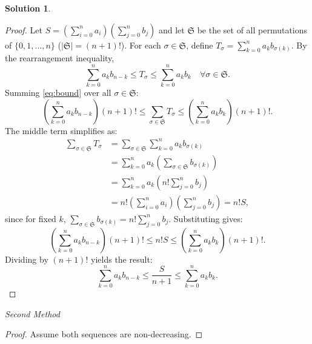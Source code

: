 \documentclass[12pt]{article}
\theoremstyle{definition}
\newtheorem*{solution}{\normalfont\textbf{Solution}}
\begin{document}
\begin{enumerate}[leftmargin=*]
\begin{solution}
\begin{proof}
                Let $S = \left( \sum_{i=0}^n a_i \right) \left( \sum_{j=0}^n b_j \right)$ and let $\mathfrak{S}$ be the set of all permutations of $\{0,1,\dots,n\}$ ($|\mathfrak{S}| = (n+1)!$). For each $\sigma \in \mathfrak{S}$, define $T_\sigma = \sum_{k=0}^n a_k b_{\sigma(k)}$. By the rearrangement inequality,
                \begin{equation}
                \sum_{k=0}^n a_k b_{n-k} \leq T_\sigma \leq \sum_{k=0}^n a_k b_k \quad \forall \sigma \in \mathfrak{S}. \label{eq:bound}
                \end{equation}
                Summing \eqref{eq:bound} over all $\sigma \in \mathfrak{S}$:
                \[
                \left( \sum_{k=0}^n a_k b_{n-k} \right) (n+1)! \leq \sum_{\sigma \in \mathfrak{S}} T_\sigma \leq \left( \sum_{k=0}^n a_k b_k \right) (n+1)!.
                \]
                The middle term simplifies as:
                \begin{align*}
                \sum_{\sigma \in \mathfrak{S}} T_\sigma 
                &= \sum_{\sigma \in \mathfrak{S}} \sum_{k=0}^n a_k b_{\sigma(k)} \\
                &= \sum_{k=0}^n a_k \left( \sum_{\sigma \in \mathfrak{S}} b_{\sigma(k)} \right) \\
                &= \sum_{k=0}^n a_k \left( n! \sum_{j=0}^n b_j \right) \\
                &= n! \left( \sum_{i=0}^n a_i \right) \left( \sum_{j=0}^n b_j \right) = n!  S,
                \end{align*}
                since for fixed $k$, $\sum_{\sigma \in \mathfrak{S}} b_{\sigma(k)} = n! \sum_{j=0}^n b_j$. Substituting gives:
                \[
                \left( \sum_{k=0}^n a_k b_{n-k} \right) (n+1)! \leq n!  S \leq \left( \sum_{k=0}^n a_k b_k \right) (n+1)!.
                \]
                Dividing by $(n+1)!$ yields the result:
                \[
                \sum_{k=0}^n a_k b_{n-k} \leq \frac{S}{n+1} \leq \sum_{k=0}^n a_k b_k.
                \]
            \end{proof}

        \textit{Second Method }
        
            \begin{proof}
                Assume both sequences are non-decreasing.


\end{proof}
\end{solution}
\end{enumerate}
\end{document}
